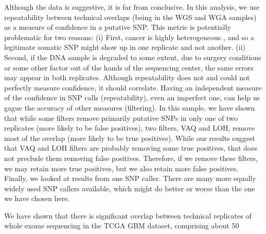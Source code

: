 \documentclass[11pt]{article} %
\begin{document}
Although the data is suggestive, it is far from conclusive. In this analysis, we use repeatability between technical overlaps (being in the WGS and WGA samples) as a measure of confidence in a putative SNP. This metric is potentially problematic for two reasons:
(i) First, cancer is highly heterogeneous \cite{hetero}, and so a legitimate somatic SNP might show up in one replicate and not another.
(ii) Second, if the DNA sample is degraded to some extent, due to surgery conditions or some other factor out of the hands of the sequencing center, the same errors may appear in both replicates. Although repeatability does not and could not perfectly measure confidence, it should correlate. Having an independent measure of the confidence in SNP calls (repeatability), even an imperfect one, can help us gague the accuracy of other measures (filtering).  
In this sample, we have shown that while some filters remove primarily putative SNPs in only one of two replicates (more likely to be false positives), two filters, VAQ and LOH, remove most of the overlap (more likely to be true positives). While our results suggest that VAQ and LOH filters are probably removing some true positives, that does not preclude them removing false positives. Therefore, if we remove these filters, we may retain more true positives, but we also retain more false positives.
Finally, we looked at results from one SNP caller. There are many more equally widely used SNP callers available, which might do better or worse than the one we have chosen here.

We have shown that there is significant overlap between technical replicates of whole exome sequencing in the TCGA GBM dataset, comprising about 50%
\end{document}
